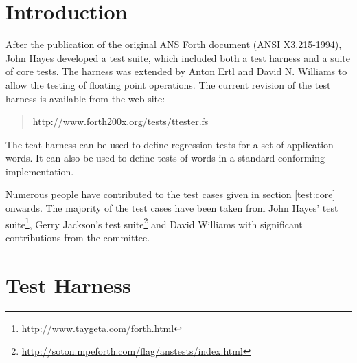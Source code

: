 \label{annex:test}

\section{Introduction} %
\label{test:intro}

After the publication of the original ANS Forth document
(ANSI X3.215-1994), John Hayes developed a test suite, which
included both a test harness and a suite of core tests.  The
harness was extended by Anton Ertl and David N. Williams to
allow the testing of floating point operations.
The current revision of the test harness is available from the
web site:
\begin{quote}
	\url{http://www.forth200x.org/tests/ttester.fs}
\end{quote}



The teat harness can be used to define regression tests for a set of
application words.  It can also be used to define tests of words in
a standard-conforming implementation.

Numerous people have contributed to the test cases given in section
\ref{test:core} onwards.  The majority of the test cases have been
taken from John Hayes' test suite\footnote{\url{http://www.taygeta.com/forth.html}},
Gerry Jackson's test suite\footnote{\url{http://soton.mpeforth.com/flag/anstests/index.html}}
and David Williams with significant contributions from the committee.

\section{Test Harness}
\label{test:harness}

